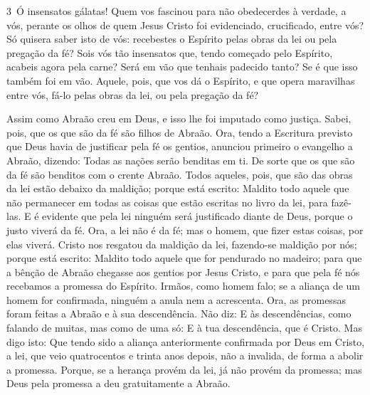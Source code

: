 \medskip

\lettrine{3}\ Ó insensatos gálatas! Quem vos fascinou para não
obedecerdes à verdade, a vós, perante os olhos de quem Jesus Cristo
foi evidenciado, crucificado, entre vós? Só quisera saber isto
de vós: recebestes o Espírito pelas obras da lei ou pela pregação da
fé? Sois vós tão insensatos que, tendo começado pelo Espírito,
acabeis agora pela carne? Será em vão que tenhais padecido
tanto? Se é que isso também foi em vão. Aquele, pois, que vos dá
o Espírito, e que opera maravilhas entre vós, fá-lo pelas obras da
lei, ou pela pregação da fé?

Assim como Abraão creu em Deus, e isso lhe foi imputado como
justiça. Sabei, pois, que os que são da fé são filhos de Abraão.
Ora, tendo a Escritura previsto que Deus havia de justificar
pela fé os gentios, anunciou primeiro o evangelho a Abraão, dizendo:
Todas as nações serão benditas em ti. De sorte que os que são da
fé são benditos com o crente Abraão. Todos aqueles, pois, que
são das obras da lei estão debaixo da maldição; porque está escrito:
Maldito todo aquele que não permanecer em todas as coisas que estão
escritas no livro da lei, para fazê-las. E é evidente que
pela lei ninguém será justificado diante de Deus, porque o justo
viverá da fé. Ora, a lei não é da fé; mas o homem, que fizer
estas coisas, por elas viverá. Cristo nos resgatou da
maldição da lei, fazendo-se maldição por nós; porque está escrito:
Maldito todo aquele que for pendurado no madeiro; para que a
bênção de Abraão chegasse aos gentios por Jesus Cristo, e para que
pela fé nós recebamos a promessa do Espírito. Irmãos, como
homem falo; se a aliança de um homem for confirmada, ninguém a anula
nem a acrescenta. Ora, as promessas foram feitas a Abraão e à
sua descendência. Não diz: E às descendências, como falando de
muitas, mas como de uma só: E à tua descendência, que é Cristo.
Mas digo isto: Que tendo sido a aliança anteriormente
confirmada por Deus em Cristo, a lei, que veio quatrocentos e trinta
anos depois, não a invalida, de forma a abolir a promessa.
Porque, se a herança provém da lei, já não provém da
promessa; mas Deus pela promessa a deu gratuitamente a Abraão.

